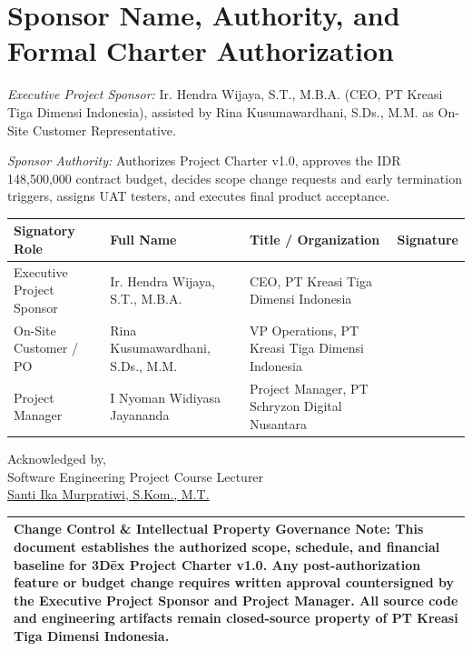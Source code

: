 \documentclass[11pt,a4paper]{article}
\newcommand{\thdr}[1]{\centering\arraybackslash\textbf{#1}}
\renewcommand{\arraystretch}{1.26}
\begin{document}
\vspace{-4pt}
\section{Sponsor Name, Authority, and Formal Charter Authorization}

\textit{Executive Project Sponsor:} Ir. Hendra Wijaya, S.T., M.B.A. (CEO, PT Kreasi Tiga Dimensi Indonesia), assisted by Rina Kusumawardhani, S.Ds., M.M. as On-Site Customer Representative.

\textit{Sponsor Authority:} Authorizes Project Charter v1.0, approves the IDR 148,500,000 contract budget, decides scope change requests and early termination triggers, assigns UAT testers, and executes final product acceptance.

\vspace{4pt}
\noindent
{\renewcommand{\arraystretch}{1.04}\small
\begin{tabularx}{\textwidth}{| L{3.9cm} | L{3.8cm} | Y | C{2.5cm} |}
\hline
{} \thdr{Signatory Role} & \thdr{Full Name} & \thdr{Title / Organization} & \thdr{Signature} \\
\hline
Executive Project Sponsor & Ir. Hendra Wijaya, S.T., M.B.A. & CEO, PT Kreasi Tiga Dimensi Indonesia & \vspace{0.58cm} \\
\hline
On-Site Customer / PO & Rina Kusumawardhani, S.Ds., M.M. & VP Operations, PT Kreasi Tiga Dimensi Indonesia & \vspace{0.58cm} \\
\hline
Project Manager & I Nyoman Widiyasa Jayananda & Project Manager, PT Schryzon Digital Nusantara & \vspace{0.58cm} \\
\hline
\end{tabularx}}

\vspace{4pt}
\begin{center}
    {\small Acknowledged by, \\
    Software Engineering Project Course Lecturer \\[0.58cm]
    \underline{Santi Ika Murpratiwi, S.Kom., M.T.}}
\end{center}

\vspace{3pt}
\noindent
{\footnotesize
\begin{tabularx}{\textwidth}{| Y |}
\hline
{} \textbf{Change Control \& Intellectual Property Governance Note:} This document establishes the authorized scope, schedule, and financial baseline for 3D\={e}x Project Charter v1.0. Any post-authorization feature or budget change requires written approval countersigned by the Executive Project Sponsor and Project Manager. All source code and engineering artifacts remain closed-source property of PT Kreasi Tiga Dimensi Indonesia. \\
\hline
\end{tabularx}}
\end{document}
